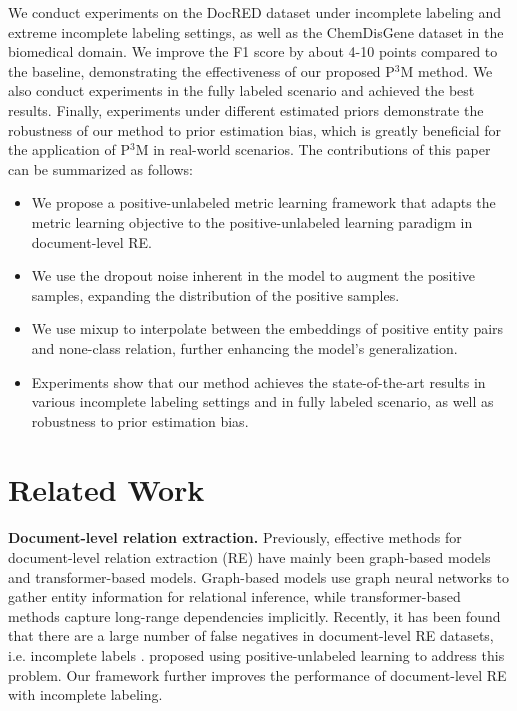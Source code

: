 \documentclass[11pt]{article}
\begin{document}
We conduct experiments on the DocRED \citep{yao-etal-2019-docred} dataset under incomplete labeling and extreme incomplete labeling settings, as well as the ChemDisGene \citep{zhang-etal-2022-distant} dataset in the biomedical domain. We improve the F1 score by about 4-10 points compared to the baseline, demonstrating the effectiveness of our proposed P$^{3}$M method. We also conduct experiments in the fully labeled scenario and achieved the best results. Finally, experiments under different estimated priors demonstrate the robustness of our method to prior estimation bias, which is greatly beneficial for the application of P$^{3}$M in real-world scenarios. The contributions of this paper can be summarized as follows:

\begin{itemize}
\item We propose a positive-unlabeled metric learning framework that adapts the metric learning objective to the positive-unlabeled learning paradigm in document-level RE.
\item We use the dropout noise inherent in the model to augment the positive samples, expanding the distribution of the positive samples.
\item We use mixup to interpolate between the embeddings of positive entity pairs and none-class relation, further enhancing the model's generalization.
\item Experiments show that our method achieves the state-of-the-art results in various incomplete labeling settings and in fully labeled scenario, as well as robustness to prior estimation bias.
\end{itemize}
\section{Related Work}

\textbf{Document-level relation extraction.} \enspace Previously, effective methods for document-level relation extraction (RE) have mainly been graph-based models and transformer-based models. Graph-based models \citep{nan-etal-2020-reasoning,li-etal-2020-graph,zeng-etal-2020-double, zeng-etal-2021-sire, Xu_Chen_Zhao_2021} use graph neural networks to gather entity information for relational inference, while transformer-based methods \citep{Zhou_Huang_Ma_Huang_2021, Xu_Wang_Lyu_Zhu_Mao_2021,ijcai2021p551,tan-etal-2022-document} capture long-range dependencies implicitly. Recently, it has been found that there are a large number of false negatives in document-level RE datasets, i.e. incomplete labels \citep{huang-etal-2022-recommend, tan-etal-2022-revisiting}. \citep{wang2022unified} proposed using positive-unlabeled learning to address this problem. Our framework further improves the performance of document-level RE with incomplete labeling.
\end{document}
